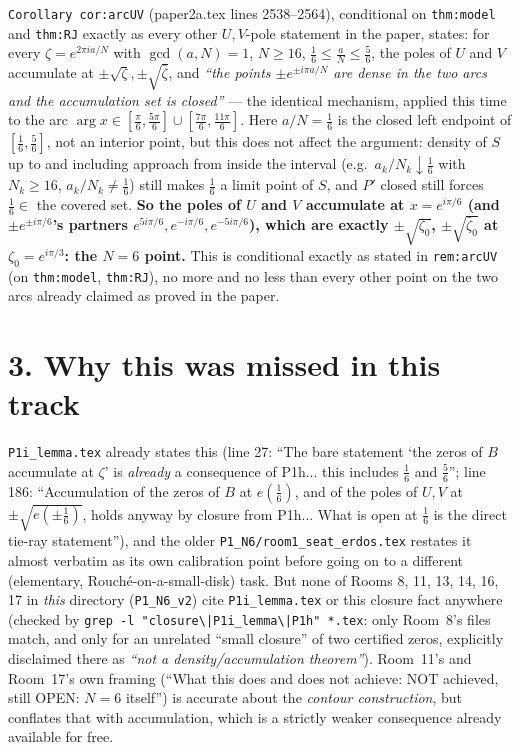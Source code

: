 \documentclass[11pt]{article}
\begin{document}
\texttt{Corollary~cor:arcUV} (paper2a.tex lines 2538--2564), conditional on \texttt{thm:model} and
\texttt{thm:RJ} exactly as every other $U,V$-pole statement in the paper, states: for every
$\zeta=e^{2\pi ia/N}$ with $\gcd(a,N)=1$, $N\ge16$, $\frac16\le\frac aN\le\frac56$, the poles of $U$
and $V$ accumulate at $\pm\sqrt\zeta,\pm\sqrt{\bar\zeta}$, and \emph{``the points $\pm e^{\pm i\pi a/N}$
are dense in the two arcs and the accumulation set is closed''} --- the identical mechanism,
applied this time to the arc $\arg x\in[\frac\pi6,\frac{5\pi}6]\cup[\frac{7\pi}6,\frac{11\pi}6]$.
Here $a/N=\frac16$ is the closed left endpoint of $[\frac16,\frac56]$, not an interior point, but
this does not affect the argument: density of $S$ up to and including approach from inside the
interval (e.g.\ $a_k/N_k\downarrow\frac16$ with $N_k\ge16$, $a_k/N_k\ne\frac16$) still makes
$\frac16$ a limit point of $S$, and $P'$ closed still forces $\frac16\in$ the covered set.
\textbf{So the poles of $U$ and $V$ accumulate at $x=e^{i\pi/6}$ (and $\pm e^{\pm i\pi/6}$'s
partners $e^{5i\pi/6},e^{-i\pi/6},e^{-5i\pi/6}$), which are exactly $\pm\sqrt{\zeta_0}$,
$\pm\sqrt{\bar\zeta_0}$ at $\zeta_0=e^{i\pi/3}$: the $N=6$ point.} This is conditional exactly as
stated in \texttt{rem:arcUV} (on \texttt{thm:model}, \texttt{thm:RJ}), no more and no less than
every other point on the two arcs already claimed as proved in the paper.

\section*{3. Why this was missed in this track}

\texttt{P1i\_lemma.tex} already states this (line 27: ``The bare statement `the zeros of $B$
accumulate at $\zeta$' is \emph{already} a consequence of P1h... this includes $\frac16$ and
$\frac56$''; line 186: ``Accumulation of the zeros of $B$ at $e(\frac16)$, and of the poles of
$U,V$ at $\pm\sqrt{e(\pm\frac16)}$, holds anyway by closure from P1h... What is open at $\frac16$ is
the direct tie-ray statement''), and the older \texttt{P1\_N6/room1\_seat\_erdos.tex} restates it
almost verbatim as its own calibration point before going on to a different (elementary,
Rouch\'e-on-a-small-disk) task. But none of Rooms 8, 11, 13, 14, 16, 17 in \emph{this} directory
(\texttt{P1\_N6\_v2}) cite \texttt{P1i\_lemma.tex} or this closure fact anywhere (checked by
\texttt{grep -l "closure\textbackslash|P1i\_lemma\textbackslash|P1h" *.tex}: only Room~8's files
match, and only for an unrelated ``small closure'' of two certified zeros, explicitly disclaimed
there as \emph{``not a density/accumulation theorem''}). Room~11's and Room~17's own framing (``What
this does and does not achieve: NOT achieved, still OPEN: $N=6$ itself'') is accurate about the
\emph{contour construction}, but conflates that with accumulation, which is a strictly weaker
consequence already available for free.
\end{document}
